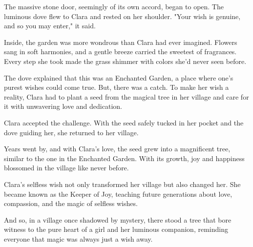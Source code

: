 \documentclass[10pt, a4paper, titlepage]{article}
\begin{document}
The massive stone door, seemingly of its own accord, began to open. The luminous dove flew to Clara and rested on her shoulder. "Your wish is genuine, and so you may enter," it said.

Inside, the garden was more wondrous than Clara had ever imagined. Flowers sang in soft harmonies, and a gentle breeze carried the sweetest of fragrances. Every step she took made the grass shimmer with colors she'd never seen before.

The dove explained that this was an Enchanted Garden, a place where one’s purest wishes could come true. But, there was a catch. To make her wish a reality, Clara had to plant a seed from the magical tree in her village and care for it with unwavering love and dedication.

Clara accepted the challenge. With the seed safely tucked in her pocket and the dove guiding her, she returned to her village.

Years went by, and with Clara's love, the seed grew into a magnificent tree, similar to the one in the Enchanted Garden. With its growth, joy and happiness blossomed in the village like never before.

Clara's selfless wish not only transformed her village but also changed her. She became known as the Keeper of Joy, teaching future generations about love, compassion, and the magic of selfless wishes.

And so, in a village once shadowed by mystery, there stood a tree that bore witness to the pure heart of a girl and her luminous companion, reminding everyone that magic was always just a wish away.
\end{document}
